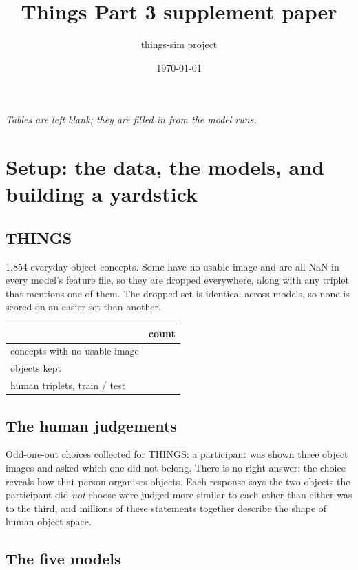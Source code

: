 \documentclass[11pt]{article}
\title{\textbf{Things Part 3 supplement paper}}
\author{things-sim project}
\date{\today}
\begin{document}
\maketitle

\noindent\textit{Tables are left blank; they are filled in from the model runs.}

\section{Setup: the data, the models, and building a yardstick}

\subsection*{THINGS}

1,854 everyday object concepts. Some have no usable image and are all-NaN in every model's feature
file, so they are dropped everywhere, along with any triplet that mentions one of them. The dropped
set is identical across models, so none is scored on an easier set than another.

\begin{center}
\begin{tabular}{@{}lc@{}}
\toprule
 & \textbf{count} \\
\midrule
concepts with no usable image & \\
objects kept & \\
human triplets, train / test & \\
\bottomrule
\end{tabular}
\end{center}

\subsection*{The human judgements}

Odd-one-out choices collected for THINGS: a participant was shown three object images and asked
which one did not belong. There is no right answer; the choice reveals how that person organises
objects. Each response says the two objects the participant did \emph{not} choose were judged more
similar to each other than either was to the third, and millions of these statements together
describe the shape of human object space.

\subsection*{The five models}
\end{document}
